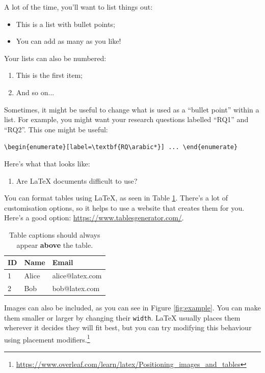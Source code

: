 \documentclass{dissertation}
\begin{document}
\noindent A lot of the time, you'll want to list things out:
\begin{itemize}
    \item This is a list with bullet points;
    \item You can add as many as you like!
\end{itemize}

\noindent Your lists can also be numbered:
\begin{enumerate}
    \item This is the first item;
    \item And so on...
\end{enumerate}

\noindent Sometimes, it might be useful to change what is used as a ``bullet point'' within a list. For example, you might want your research questions labelled ``RQ1'' and ``RQ2''. This one might be useful:

\begin{center}
    \verb|\begin{enumerate}[label=\textbf{RQ\arabic*}] ... \end{enumerate}|
\end{center}

\noindent Here's what that looks like:

\begin{enumerate}[label=\textbf{RQ\arabic*}] 
    \item Are LaTeX documents difficult to use?
\end{enumerate}

\noindent You can format tables using LaTeX, as seen in Table \ref{table:example}. There's a lot of customisation options, so it helps to use a website that creates them for you. Here's a good option: \url{https://www.tablesgenerator.com/}.

\begin{table}[h]
\caption{Table captions should always appear \textbf{above} the table.}
\begin{tabular}{l|l|l}
ID & Name  & Email           \\ \hline
1  & Alice & alice@latex.com \\
2  & Bob   & bob@latex.com  
\end{tabular}
\label{table:example}
\end{table}

Images can also be included, as you can see in Figure \ref{fig:example}. You can make them smaller or larger by changing their \texttt{width}. LaTeX usually places them wherever it decides they will fit best, but you can try modifying this behaviour using placement modifiers.\footnote{\url{https://www.overleaf.com/learn/latex/Positioning_images_and_tables}}
\end{document}
